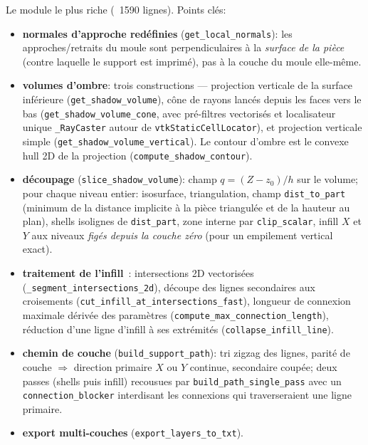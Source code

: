 \documentclass[11pt,a4paper]{article}
\begin{document}
Le module le plus riche (~1590 lignes). Points clés:
\begin{itemize}
  \item \textbf{normales d'approche redéfinies}
        (\texttt{get\_local\_normals}): les approches/retraits du moule
        sont perpendiculaires à la \emph{surface de la pièce} (contre
        laquelle le support est imprimé), pas à la couche du moule
        elle-même.
  \item \textbf{volumes d'ombre}: trois constructions ---
        projection verticale de la surface inférieure
        (\texttt{get\_shadow\_volume}), cône de rayons lancés depuis
        les faces vers le bas (\texttt{get\_shadow\_volume\_cone}, avec
        pré-filtres vectorisés et localisateur unique
        \texttt{\_RayCaster} autour de \texttt{vtkStaticCellLocator}),
        et projection verticale simple
        (\texttt{get\_shadow\_volume\_vertical}). Le contour d'ombre est
        le convexe hull 2D de la projection (\texttt{compute\_shadow\_contour}).
  \item \textbf{découpage} (\texttt{slice\_shadow\_volume}): champ
        $q = (Z - z_0)/h$ sur le volume; pour chaque niveau entier:
        isosurface, triangulation, champ \texttt{dist\_to\_part}
        (minimum de la distance implicite à la pièce triangulée et de
        la hauteur au plan), shells isolignes de
        \texttt{dist\_part}, zone interne par \texttt{clip\_scalar},
        infill $X$ et $Y$ aux niveaux \emph{figés depuis la couche
        zéro} (pour un empilement vertical exact).
  \item \textbf{traitement de l'infill}~: intersections 2D
        vectorisées (\texttt{\_segment\_intersections\_2d}), découpe
        des lignes secondaires aux croisements
        (\texttt{cut\_infill\_at\_intersections\_fast}), longueur de
        connexion maximale dérivée des paramètres
        (\texttt{compute\_max\_connection\_length}), réduction d'une
        ligne d'infill à ses extrémités
        (\texttt{collapse\_infill\_line}).
  \item \textbf{chemin de couche} (\texttt{build\_support\_path}):
        tri zigzag des lignes, parité de couche $\Rightarrow$ direction
        primaire $X$ ou $Y$ continue, secondaire coupée; deux passes
        (shells puis infill) recousues par
        \texttt{build\_path\_single\_pass} avec un
        \texttt{connection\_blocker} interdisant les connexions qui
        traverseraient une ligne primaire.
  \item \textbf{export multi-couches}
        (\texttt{export\_layers\_to\_txt}).
\end{itemize}
\end{document}
